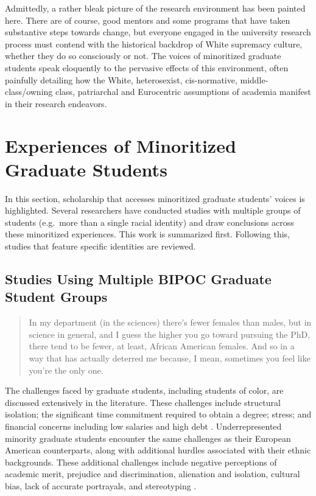 \documentclass[
  11pt,
]{book}
\begin{document}
Admittedly, a rather bleak picture of the research environment has been painted here. There are of course, good mentors and some programs that have taken substantive steps towards change, but everyone engaged in the university research process must contend with the historical backdrop of White supremacy culture, whether they do so consciously or not. The voices of minoritized graduate students speak eloquently to the pervasive effects of this environment, often painfully detailing how the White, heterosexist, cis-normative, middle-class/owning class, patriarchal and Eurocentric assumptions of academia manifest in their research endeavors.

\section{Experiences of Minoritized Graduate Students}\label{experiences-of-minoritized-graduate-students}

In this section, scholarship that accesses minoritized graduate students' voices is highlighted. Several researchers have conducted studies with multiple groups of students (e.g.~more than a single racial identity) and draw conclusions across these minoritized experiences. This work is summarized first. Following this, studies that feature specific identities are reviewed.

\subsection{Studies Using Multiple BIPOC Graduate Student Groups}\label{studies-using-multiple-bipoc-graduate-student-groups}

\begin{quote}
In my department (in the sciences) there's fewer females than males, but in science in general, and I guess the higher you go toward pursuing the PhD, there tend to be fewer, at least, African American females. And so in a way that has actually deterred me because, I mean, sometimes you feel like you're the only one. \citep[p.~238]{levin_graduate_2013}
\end{quote}

The challenges faced by graduate students, including students of color, are discussed extensively in the literature. These challenges include structural isolation; the significant time commitment required to obtain a degree; stress; and financial concerns including low salaries and high debt \citep{maton_experiences_2011}. Underrepresented minority graduate students encounter the same challenges as their European American counterparts, along with additional hurdles associated with their ethnic backgrounds. These additional challenges include negative perceptions of academic merit, prejudice and discrimination, alienation and isolation, cultural bias, lack of accurate portrayals, and stereotyping \citep{curry_systematized_2020, maton_experiences_2011}.
\end{document}
